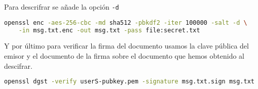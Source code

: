 \documentclass{article}
\begin{document}
Para descrifrar se añade la opción \texttt{-d}

\begin{lstlisting}[language=bash]
  openssl enc -aes-256-cbc -md sha512 -pbkdf2 -iter 100000 -salt -d \
    -in msg.txt.enc -out msg.txt -pass file:secret.txt
\end{lstlisting}

Y por último para verificar la firma del documento usamos la clave pública del emisor y el documento de la firma sobre el documento que hemos
obtenido al descifrar.

\begin{lstlisting}[language=bash]
  openssl dgst -verify userS-pubkey.pem -signature msg.txt.sign msg.txt
\end{lstlisting}
\end{document}
